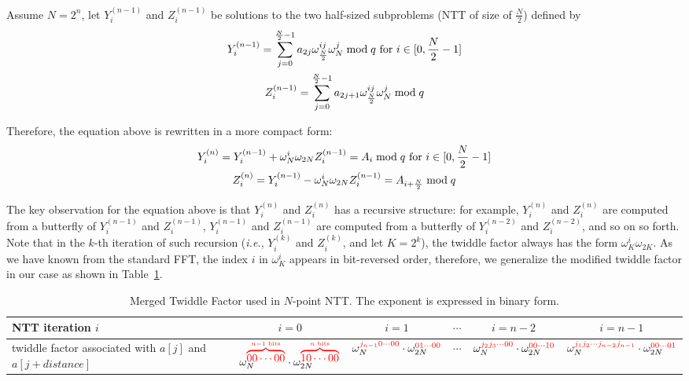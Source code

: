 \documentclass[submission]{iacrtrans}
\theoremstyle{plain}
\begin{document}
Assume $N=2^n$, let $Y_i^{(n-1)}$ and $Z_i^{(n-1)}$ be solutions to the two half-sized subproblems (NTT of size of $\frac{N}{2}$) defined by
\begin{gather}
    Y_i^{(n-1)} = \sum_{j=0}^{\frac{N}{2}-1}a_{2j}\omega_{\frac{N}{2}}^{ij}\omega_{N}^{j} \bmod q \text{ for } i\in [0,\frac{N}{2}-1]\notag\\
    Z_i^{(n-1)} = \sum_{j=0}^{\frac{N}{2}-1}a_{2j+1}\omega_{\frac{N}{2}}^{ij}\omega_N^{j} \bmod q \notag
\end{gather}

Therefore, the equation above is rewritten in a more compact form:
\begin{gather}
    Y_i^{(n)} = Y_i^{(n-1)} + \omega_{N}^i\omega_{2N}Z_i^{(n-1)} = A_i\bmod q \text{ for } i\in [0,\frac{N}{2}-1]\notag\\
    Z_i^{(n)} = Y_i^{(n-1)} - \omega_{N}^i\omega_{2N}Z_i^{(n-1)} = A_{i+\frac{N}{2}} \bmod q \notag
\end{gather}

The key observation for the equation above is that $Y_i^{(n)}$ and $Z_i^{(n)}$ has a recursive structure: for example, $Y_i^{(n)}$ and $Z_i^{(n)}$ are computed from a butterfly of  $Y_i^{(n-1)}$ and $Z_i^{(n-1)}$, $Y_i^{(n-1)}$ and $Z_i^{(n-1)}$ are computed from a butterfly of $Y_i^{(n-2)}$ and $Z_i^{(n-2)}$, and so on so forth. Note that in the $k$-th iteration of such recursion (\textit{i.e.}, $Y_i^{(k)}$ and $Z_i^{(k)}$, and let $K=2^k$), the twiddle factor always has the form $\omega_K^i\omega_{2K}$. As we have known from the standard FFT, the index $i$ in $\omega_K^i$ appears in bit-reversed order, therefore, we generalize the modified twiddle factor in our case as shown in Table~\ref{table:merged_tf}.
\begin{table}\centering
\begin{tabular}{lccccc}
 \hline
 NTT iteration $i$ & $i=0$ & $i=1$ & $\cdots$ & $i=n-2$ & $i=n-1$\\
 \hline
 \makecell{twiddle factor\\ associated with\\ $a[j]$ and\\ $a[j+distance]$} & $\omega_{N}^{\textcolor{red}{\overbrace{00\cdots00}^{n-1 \text{ bits}}}}\cdot \omega_{2N}^{\textcolor{red}{\overbrace{10\cdots00}^{n \text{ bits}}}}$ & $\omega_{N}^{\textcolor{red}{j_{n-1}0\cdots 00}}\cdot\omega_{2N}^{\textcolor{red}{01\cdots 00}}$  & $\cdots$ & $\omega_{N}^{\textcolor{red}{j_{2}j_{3}\cdots 00}}\cdot \omega_{2N}^{\textcolor{red}{00\cdots 10}}$ & $\omega_{N}^{\textcolor{red}{j_{1}j_{2}\cdots j_{n-2}j_{n-1}}}\cdot \omega_{2N}^{\textcolor{red}{00\cdots 01}}$\\
 \hline
 \end{tabular}
   \caption{Merged Twiddle Factor used in $N$-point NTT. The exponent is expressed in binary form.}
  \label{table:merged_tf}
 \end{table}
\end{document}
